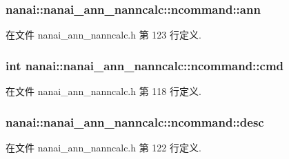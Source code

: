 \subsubsection[{ann}]{ nanai\+::nanai\+\_\+ann\+\_\+nanncalc\+::ncommand\+::ann}\label{structnanai_1_1nanai__ann__nanncalc_1_1ncommand_a64d0d3494fb258a2d7dc7770b7a1da96}


在文件 nanai\+\_\+ann\+\_\+nanncalc.\+h 第 123 行定义.

\hypertarget{structnanai_1_1nanai__ann__nanncalc_1_1ncommand_a4a61797e6f5a657c50a34a5fb3abda56}{}
\subsubsection[{cmd}]{\setlength{\rightskip}{0pt plus 5cm}int nanai\+::nanai\+\_\+ann\+\_\+nanncalc\+::ncommand\+::cmd}\label{structnanai_1_1nanai__ann__nanncalc_1_1ncommand_a4a61797e6f5a657c50a34a5fb3abda56}


在文件 nanai\+\_\+ann\+\_\+nanncalc.\+h 第 118 行定义.

\hypertarget{structnanai_1_1nanai__ann__nanncalc_1_1ncommand_ad5b646ce90221dc90cc161b8293ba0eb}{}
\subsubsection[{desc}]{ nanai\+::nanai\+\_\+ann\+\_\+nanncalc\+::ncommand\+::desc}\label{structnanai_1_1nanai__ann__nanncalc_1_1ncommand_ad5b646ce90221dc90cc161b8293ba0eb}


在文件 nanai\+\_\+ann\+\_\+nanncalc.\+h 第 122 行定义.

\hypertarget{structnanai_1_1nanai__ann__nanncalc_1_1ncommand_acb609b08ab6f835678886dfeec79da71}{}
